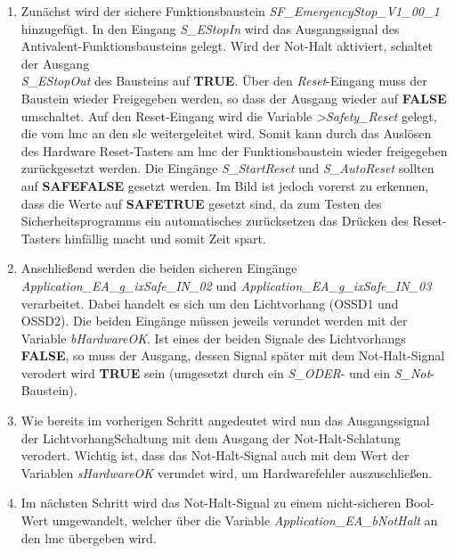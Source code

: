 \documentclass[../../../Bachelorarbeit.tex]{subfiles}
\begin{document}
\begin{enumerate}
\begin{minipage}[t]{\linewidth}
        \label{fig:my-img43}
    \end{minipage}
    \item Zunächst wird der sichere Funktionsbaustein \textit{SF\_EmergencyStop\_V1\_00\_1} hinzugefügt. In den Eingang \textit{S\_EStopIn} wird das Ausgangssignal des Antivalent-Funktionsbausteins gelegt. Wird der Not-Halt aktiviert, schaltet der Ausgang \\ \textit{S\_EStopOut} des Bausteins auf \textbf{TRUE}. Über den \textit{Reset}-Eingang muss der Baustein wieder Freigegeben werden, so dass der Ausgang wieder auf \textbf{FALSE} umschaltet. Auf den Reset-Eingang wird die Variable \textit{>Safety\_Reset} gelegt, die vom \acs{lmc} an den \acs{slc} weitergeleitet wird. Somit kann durch das Auslösen des Hardware Reset-Tasters am \acs{lmc} der Funktionsbaustein wieder freigegeben \bzw zurückgesetzt werden. Die Eingänge \textit{S\_StartReset} und \textit{S\_AutoReset} sollten auf \textbf{SAFEFALSE} gesetzt werden. Im Bild ist jedoch vorerst zu erkennen, dass die Werte auf \textbf{SAFETRUE} gesetzt sind, da zum Testen des Sicherheitsprogramms ein automatisches zurücksetzen das Drücken des Reset-Tasters hinfällig macht und somit Zeit spart.
    \item Anschließend werden die beiden sicheren Eingänge \textit{Application\_EA\_g\_ixSafe\_IN\_02} und \textit{Application\_EA\_g\_ixSafe\_IN\_03} verarbeitet. Dabei handelt es sich um den Lichtvorhang (OSSD1 und OSSD2). Die beiden Eingänge müssen jeweils verundet werden mit der Variable \textit{bHardwareOK}. Ist eines der beiden Signale des Lichtvorhangs \textbf{FALSE}, so muss der Ausgang, dessen Signal später mit dem Not-Halt-Signal verodert wird \textbf{TRUE} sein (umgesetzt durch ein \textit{S\_ODER}- und ein \textit{S\_Not}-Baustein).
    \item Wie bereits im vorherigen Schritt angedeutet wird nun das Ausgangssignal der LichtvorhangSchaltung mit dem Ausgang der Not-Halt-Schlatung verodert. Wichtig ist, dass das Not-Halt-Signal auch mit dem Wert der Variablen \textit{sHardwareOK} verundet wird, um Hardwarefehler auszuschließen.
    \item Im nächsten Schritt wird das Not-Halt-Signal zu einem nicht-sicheren Bool-Wert umgewandelt, welcher über die Variable \textit{Application\_EA\_bNotHalt} an den \acs{lmc} übergeben wird.

\end{enumerate}
\end{document}
